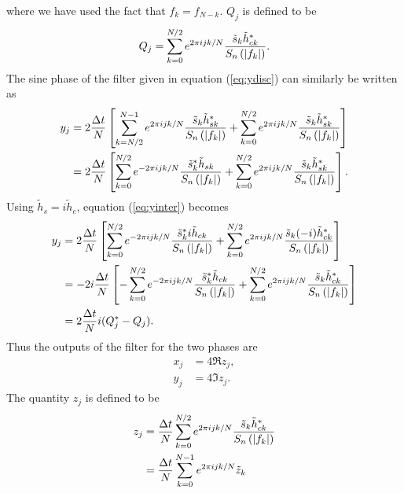 where we have used the fact that $f_k = f_{N-k}$. $Q_j$ is defined to be
\begin{equation}
\label{eq:Qdef}
Q_j = \sum_{k=0}^{N/2} e^{2\pi ijk/N} 
  \frac{\tilde{s}_k \tilde{h}_{ck}^\ast}{S_n\left(\left|f_{k}\right|\right)}.
\end{equation}
The sine phase of the filter given in equation (\ref{eq:ydisc}) can similarly
be written as
\begin{equation}
\begin{split}
\label{eq:yinter}
y_j &=
2\frac{\Delta t}{N}
\left[
  \sum_{k=N/2}^{N-1} e^{2\pi ijk/N} 
  \frac{\tilde{s}_k \tilde{h}_{sk}^\ast}{S_n\left(\left|f_{k}\right|\right)}
  +
  \sum_{k=0}^{N/2} e^{2\pi ijk/N} 
  \frac{\tilde{s}_k \tilde{h}_{sk}^\ast}{S_n\left(\left|f_{k}\right|\right)}
\right] \\
&= 
2\frac{\Delta t}{N}
\left[
  \sum_{k=0}^{N/2} e^{-2\pi ijk/N} 
  \frac{\tilde{s}_k^\ast \tilde{h}_{sk}}{S_n\left(\left|f_{k}\right|\right)}
  +
  \sum_{k=0}^{N/2} e^{2\pi ijk/N} 
  \frac{\tilde{s}_k \tilde{h}_{sk}^\ast}{S_n\left(\left|f_{k}\right|\right)}
\right].
\end{split}
\end{equation}
Using $\tilde{h}_s = i \tilde{h}_c$, equation (\ref{eq:yinter}) becomes
\begin{equation}
\begin{split}
y_j &= 
2\frac{\Delta t}{N}
\left[
  \sum_{k=0}^{N/2} e^{-2\pi ijk/N} 
  \frac{\tilde{s}_k^\ast i\tilde{h}_{ck}}{S_n\left(\left|f_{k}\right|\right)}
  +
  \sum_{k=0}^{N/2} e^{2\pi ijk/N} 
  \frac{\tilde{s}_k (-i)\tilde{h}_{ck}^\ast}{S_n\left(\left|f_{k}\right|\right)}
\right] \\
& = 
-2i\frac{\Delta t}{N}
\left[
  - \sum_{k=0}^{N/2} e^{-2\pi ijk/N} 
  \frac{\tilde{s}_k^\ast \tilde{h}_{ck}}{S_n\left(\left|f_{k}\right|\right)}
  +
  \sum_{k=0}^{N/2} e^{2\pi ijk/N} 
  \frac{\tilde{s}_k \tilde{h}_{ck}^\ast}{S_n\left(\left|f_{k}\right|\right)}
\right] \\
& = 
2\frac{\Delta t}{N}i(Q_j^\ast - Q_j).
\end{split}
\end{equation}
Thus the outputs of the filter for the two phases are
\begin{align}
x_j &= 4 \Re z_j, \\
y_j &= 4 \Im z_j.
\end{align}
The quantity $z_j$ is defined to be
\begin{equation}
\begin{split}
\label{eq:zdef}
z_j &= \frac{\Delta t}{N}\sum_{k=0}^{N/2} e^{2\pi ijk/N} 
\frac{\tilde{s}_k \tilde{h}_{ck}^\ast}{S_n\left(\left|f_{k}\right|\right)}  \\
&= \frac{\Delta t}{N}\sum_{k=0}^{N-1} e^{2\pi ijk/N} \tilde{z}_k
\end{split}
\end{equation}
